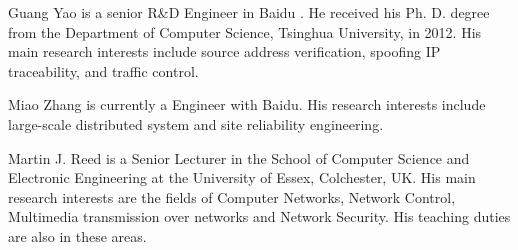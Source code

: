 \documentclass[10pt,journal,compsoc]{IEEEtran}
\begin{document}

\begin{IEEEbiography}
{Guang Yao} is a senior R\&D Engineer in Baidu . He received his Ph. D. degree from the Department of Computer Science, Tsinghua University, in 2012. His main research interests include source address verification, spoofing IP traceability, and traffic control.
\end{IEEEbiography}

\begin{IEEEbiographynophoto}
{Miao Zhang} is currently a Engineer with Baidu. His research interests include large-scale distributed system and site reliability engineering.
\end{IEEEbiographynophoto}

\begin{IEEEbiography}
{Martin J. Reed} is a Senior Lecturer in the School of Computer Science and Electronic Engineering at the University of Essex, Colchester, UK. His main research interests are the fields of Computer Networks, Network Control, Multimedia transmission over networks and Network Security. His teaching duties are also in these areas.
\end{IEEEbiography}
\end{document}
